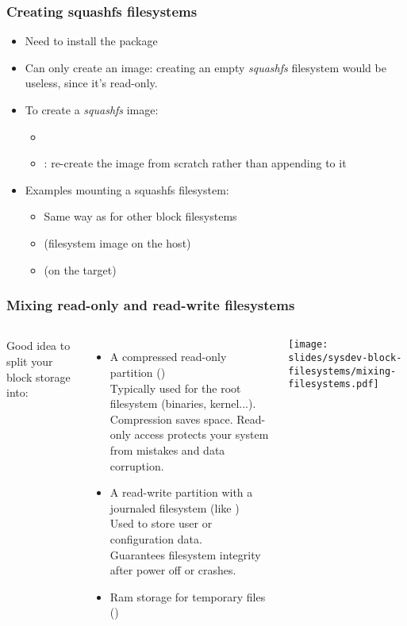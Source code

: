\begin{frame}
  \frametitle{Creating squashfs filesystems}
  \begin{itemize}
  \item Need to install the  package
  \item Can only create an image: creating an empty {\em squashfs}
    filesystem would be useless, since it's read-only.
  \item To create a {\em squashfs} image:
    \begin{itemize}
    \item {}
    \item {}: re-create the image from scratch rather
      than appending to it
    \end{itemize}
  \item Examples mounting a squashfs filesystem:
    \begin{itemize}
    \item Same way as for other block filesystems
    \item {} (filesystem image on the host)
    \item {} (on the target)
    \end{itemize}
  \end{itemize}
\end{frame}

\begin{frame}
  \frametitle{Mixing read-only and read-write filesystems}
  \begin{columns}
    Good idea to split your block storage into:
    \begin{itemize}
    \item A compressed read-only partition ()\\
      Typically used for the root filesystem (binaries, kernel...).\\
      Compression saves space. Read-only access protects your system
      from mistakes and data corruption.
    \item A read-write partition with a journaled filesystem (like )\\
      Used to store user or configuration data.\\
      Guarantees filesystem integrity after power off or crashes.
    \item Ram storage for temporary files ()
    \end{itemize}
    \texttt{[image: slides/sysdev-block-filesystems/mixing-filesystems.pdf]}
  \end{columns}
\end{frame}

